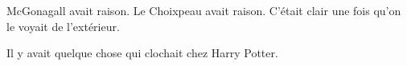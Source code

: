 McGonagall avait raison.
Le Choixpeau avait raison.
C'était clair une fois qu'on le voyait de l'extérieur.

Il y avait quelque chose qui clochait chez Harry Potter.

